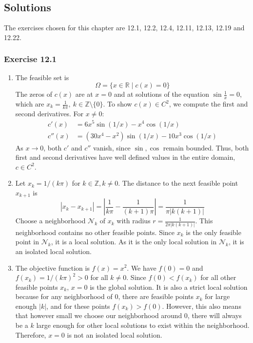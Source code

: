 \subsection{Solutions}
The exercises chosen for this chapter are 12.1, 12.2, 12.4, 12.11, 12.13, 12.19 and 12.22.

\subsubsection{Exercise 12.1}
\begin{enumerate}
    \item[(a)]
          The feasible set is
          \[
              \Omega = \{x \in \mathbb{R} \mid c(x)=0\}
          \]
          The zeros of $c(x)$ are at $x = 0$ and at solutions of the equation $\sin\frac{1}{x} = 0$, which are $x_k = \frac{1}{k\pi}, \> k\in\mathbb{Z} \setminus \{0\}$.
          To show $c(x) \in C^2$, we compute the first and second derivatives. For $x \neq 0$:
          \begin{align*}
              c'(x)  & = 6x^5 \sin(1/x) - x^4 \cos(1/x)         \\
              c''(x) & = (30x^4-x^2)\sin(1/x) - 10x^3 \cos(1/x)
          \end{align*}
          As $x\to 0$, both $c'$ and $c''$ vanish, since $\sin, \cos$ remain bounded.
          Thus, both first and second derivatives have well defined values in the entire domain, $c \in C^2$.

    \item[(b)]
          Let $x_k = 1/(k\pi)$ for $k \in \mathbb{Z}, k \neq 0$. The distance to the next feasible point $x_{k+1}$ is
          \[
              |x_k - x_{k+1}| = \left|\frac{1}{k\pi} - \frac{1}{(k+1)\pi}\right| = \frac{1}{\pi|k(k+1)|}
          \]
          Choose a neighborhood $\mathcal{N}_k$ of $x_k$ with radius $r = \frac{1}{2\pi|k(k+1)|}$. This neighborhood contains no other feasible points. Since $x_k$ is the only feasible point in $\mathcal{N}_k$, it is a local solution. As it is the only local solution in $\mathcal{N}_k$, it is an isolated local solution.

    \item[(c)]
          The objective function is $f(x) = x^2$. We have $f(0)=0$ and $f(x_k) = 1/(k\pi)^2 > 0$ for all $k \neq 0$.
          Since $f(0) < f(x_k)$ for all other feasible points $x_k$, $x=0$ is the global solution.
          It is also a strict local solution because for any neighborhood of $0$, there are feasible points $x_k$ for large enough $|k|$, and for these points $f(x_k) > f(0)$.
          However, this also means that however small we choose our neighborhood around $0$, there will always be a $k$ large enough for other local solutions to exist within the neighborhood.
          Therefore, $x=0$ is not an isolated local solution.
\end{enumerate}
